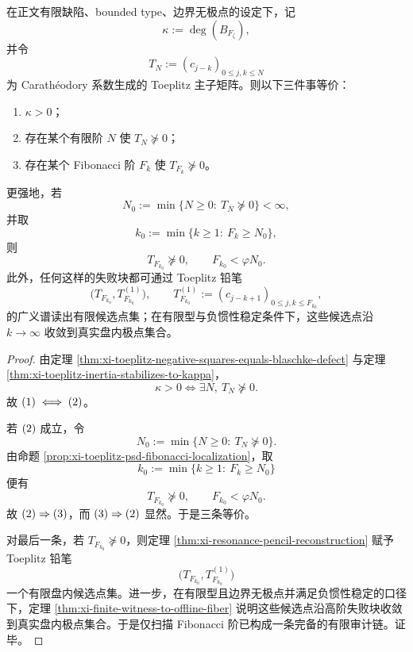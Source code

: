\begin{theorem}\label{thm:conclusion-visible-finite-type-fibonacci-complete-audit}
在正文有限缺陷、bounded type、边界无极点的设定下，记
\[
\kappa:=\deg(B_{F_\zeta}),
\]
并令
\[
T_N:=(c_{j-k})_{0\le j,k\le N}
\]
为 Carath\'eodory 系数生成的 Toeplitz 主子矩阵。则以下三件事等价：
\begin{enumerate}
  \item \(\kappa>0\)；
  \item 存在某个有限阶 \(N\) 使 \(T_N\nsucceq 0\)；
  \item 存在某个 Fibonacci 阶 \(F_k\) 使 \(T_{F_k}\nsucceq 0\)。
\end{enumerate}
更强地，若
\[
N_0:=\min\{N\ge 0:\ T_N\nsucceq 0\}<\infty,
\]
并取
\[
k_0:=\min\{k\ge 1:\ F_k\ge N_0\},
\]
则
\[
T_{F_{k_0}}\nsucceq 0,
\qquad
F_{k_0}<\varphi N_0.
\]
此外，任何这样的失败块都可通过 Toeplitz 铅笔
\[
\bigl(T_{F_{k_0}},T^{(1)}_{F_{k_0}}\bigr),
\qquad
T^{(1)}_{F_{k_0}}:=(c_{j-k+1})_{0\le j,k\le F_{k_0}},
\]
的广义谱读出有限候选点集；在有限型与负惯性稳定条件下，这些候选点沿 \(k\to\infty\) 收敛到真实盘内极点集合。
\end{theorem}
\begin{proof}
由定理 \ref{thm:xi-toeplitz-negative-squares-equals-blaschke-defect} 与定理 \ref{thm:xi-toeplitz-inertia-stabilizes-to-kappa}，
\[
\kappa>0
\iff
\exists N,\ T_N\nsucceq 0.
\]
故 \(\textup{(1)}\iff\textup{(2)}\)。

若 \(\textup{(2)}\) 成立，令
\[
N_0:=\min\{N\ge 0:\ T_N\nsucceq 0\}.
\]
由命题 \ref{prop:xi-toeplitz-psd-fibonacci-localization}，取
\[
k_0:=\min\{k\ge 1:\ F_k\ge N_0\}
\]
便有
\[
T_{F_{k_0}}\nsucceq 0,
\qquad
F_{k_0}<\varphi N_0.
\]
故 \(\textup{(2)}\Rightarrow\textup{(3)}\)，而 \(\textup{(3)}\Rightarrow\textup{(2)}\) 显然。于是三条等价。

对最后一条，若 \(T_{F_{k_0}}\nsucceq 0\)，则定理 \ref{thm:xi-resonance-pencil-reconstruction} 赋予 Toeplitz 铅笔
\[
\bigl(T_{F_{k_0}},T^{(1)}_{F_{k_0}}\bigr)
\]
一个有限盘内候选点集。进一步，在有限型且边界无极点并满足负惯性稳定的口径下，定理 \ref{thm:xi-finite-witness-to-offline-fiber} 说明这些候选点沿高阶失败块收敛到真实盘内极点集合。于是仅扫描 Fibonacci 阶已构成一条完备的有限审计链。证毕。
\end{proof}
